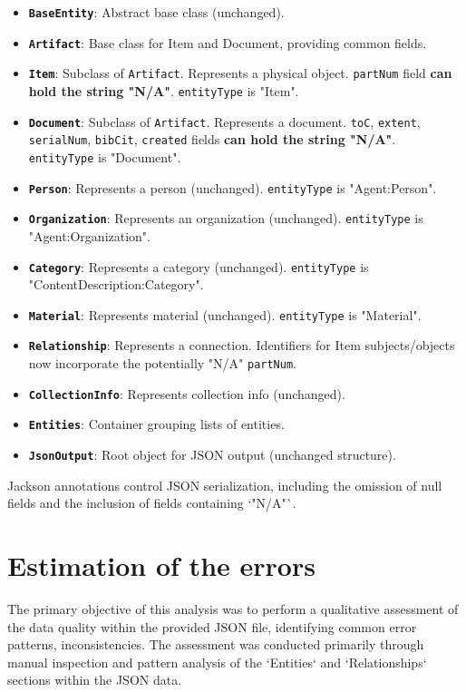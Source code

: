 \documentclass[11pt, a4paper]{article}
\begin{document}
\begin{itemize}
    \item \textbf{\texttt{BaseEntity}}: Abstract base class (unchanged).
    \item \textbf{\texttt{Artifact}}: Base class for Item and Document, providing common fields.
    \item \textbf{\texttt{Item}}: Subclass of \texttt{Artifact}. Represents a physical object. \texttt{partNum} field \textbf{can hold the string "N/A"}. \texttt{entityType} is "Item".
    \item \textbf{\texttt{Document}}: Subclass of \texttt{Artifact}. Represents a document. \texttt{toC}, \texttt{extent}, \texttt{serialNum}, \texttt{bibCit}, \texttt{created} fields \textbf{can hold the string "N/A"}. \texttt{entityType} is "Document".
    \item \textbf{\texttt{Person}}: Represents a person (unchanged). \texttt{entityType} is "Agent:Person".
    \item \textbf{\texttt{Organization}}: Represents an organization (unchanged). \texttt{entityType} is "Agent:Organization".
    \item \textbf{\texttt{Category}}: Represents a category (unchanged). \texttt{entityType} is "ContentDescription:Category".
    \item \textbf{\texttt{Material}}: Represents material (unchanged). \texttt{entityType} is "Material".
    \item \textbf{\texttt{Relationship}}: Represents a connection. Identifiers for Item subjects/objects now incorporate the potentially "N/A" \texttt{partNum}.
    \item \textbf{\texttt{CollectionInfo}}: Represents collection info (unchanged).
    \item \textbf{\texttt{Entities}}: Container grouping lists of entities.
    \item \textbf{\texttt{JsonOutput}}: Root object for JSON output (unchanged structure).
\end{itemize}
Jackson annotations control JSON serialization, including the omission of null fields and the inclusion of fields containing `"N/A"`.


\section{Estimation of the errors}
The primary objective of this analysis was to perform a qualitative assessment of the data quality within the provided JSON file, identifying common error patterns, inconsistencies.
\newline
The assessment was conducted primarily through manual inspection and pattern analysis of the `Entities` and `Relationships` sections within the JSON data.
\end{document}
